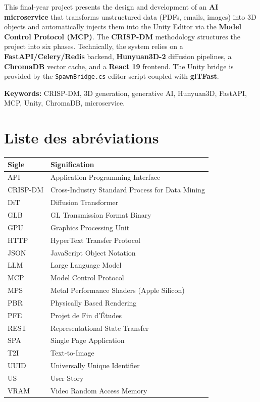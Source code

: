 \documentclass[12pt,a4paper,oneside]{report}
\begin{document}
This final-year project presents the design and development of an
\textbf{AI microservice} that transforms unstructured data (PDFs, emails,
images) into 3D objects and automatically injects them into the Unity Editor
via the \textbf{Model Control Protocol (MCP)}. The \textbf{CRISP-DM}
methodology structures the project into six phases. Technically, the system
relies on a \textbf{FastAPI/Celery/Redis} backend, \textbf{Hunyuan3D-2}
diffusion pipelines, a \textbf{ChromaDB} vector cache, and a \textbf{React 19}
frontend. The Unity bridge is provided by the \texttt{SpawnBridge.cs} editor
script coupled with \textbf{glTFast}.

\textbf{Keywords:} CRISP-DM, 3D generation, generative AI, Hunyuan3D, FastAPI,
MCP, Unity, ChromaDB, microservice.

\cleardoublepage\tableofcontents
\cleardoublepage\listoffigures
{}
\cleardoublepage\listoftables
{}

\cleardoublepage
\chapter*{Liste des abréviations}
\begin{tabular}{@{}lp{10.5cm}@{}}
\toprule
\textbf{Sigle} & \textbf{Signification} \\\midrule
API     & Application Programming Interface \\
CRISP-DM& Cross-Industry Standard Process for Data Mining \\
DiT     & Diffusion Transformer \\
GLB     & GL Transmission Format Binary \\
GPU     & Graphics Processing Unit \\
HTTP    & HyperText Transfer Protocol \\
JSON    & JavaScript Object Notation \\
LLM     & Large Language Model \\
MCP     & Model Control Protocol \\
MPS     & Metal Performance Shaders (Apple Silicon) \\
PBR     & Physically Based Rendering \\
PFE     & Projet de Fin d'Études \\
REST    & Representational State Transfer \\
SPA     & Single Page Application \\
T2I     & Text-to-Image \\
UUID    & Universally Unique Identifier \\
US      & User Story \\
VRAM    & Video Random Access Memory \\
\bottomrule
\end{tabular}
\end{document}
